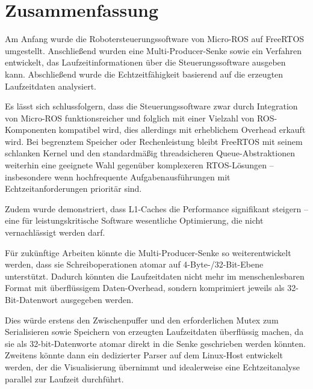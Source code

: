 \section{Zusammenfassung}

Am Anfang wurde die Robotersteuerungssoftware von Micro-ROS auf FreeRTOS
umgestellt. Anschließend wurden eine Multi-Producer-Senke sowie ein Verfahren
entwickelt, das Laufzeitinformationen über die Steuerungssoftware ausgeben kann.
Abschließend wurde die Echtzeitfähigkeit basierend auf die erzeugten
Laufzeitdaten analysiert.

Es lässt sich schlussfolgern, dass die Steuerungssoftware zwar durch Integration
von Micro-ROS funktionsreicher und folglich mit einer Vielzahl von
ROS-Komponenten kompatibel wird, dies allerdings mit erheblichem Overhead
erkauft wird. Bei begrenztem Speicher oder Rechenleistung bleibt FreeRTOS mit
seinem schlanken Kernel und den standardmäßig threadsicheren Queue-Abstraktionen
weiterhin eine geeignete Wahl gegenüber komplexeren RTOS-Lösungen --
insbesondere wenn hochfrequente Aufgabenausführungen mit Echtzeitanforderungen
prioritär sind.

Zudem wurde demonstriert, dass L1-Caches die Performance signifikant steigern --
eine für leistungskritische Software wesentliche Optimierung, die nicht
vernachlässigt werden darf.

Für zukünftige Arbeiten könnte die Multi-Producer-Senke so weiterentwickelt
werden, dass sie Schreiboperationen atomar auf 4-Byte-/32-Bit-Ebene unterstützt.
Dadurch könnten die Laufzeitdaten nicht mehr im menschenlesbaren Format mit
überflüssigem Daten-Overhead, sondern komprimiert jeweils als 32-Bit-Datenwort
ausgegeben werden.

Dies würde erstens den Zwischenpuffer und den erforderlichen Mutex zum
Serialisieren sowie Speichern von erzeugten Laufzeitdaten überflüssig machen, da
sie als 32-bit-Datenworte atomar direkt in die Senke geschrieben werden könnten.
Zweitens könnte dann ein dedizierter Parser auf dem Linux-Host entwickelt
werden, der die Visualisierung übernimmt und idealerweise eine Echtzeitanalyse
parallel zur Laufzeit durchführt.

